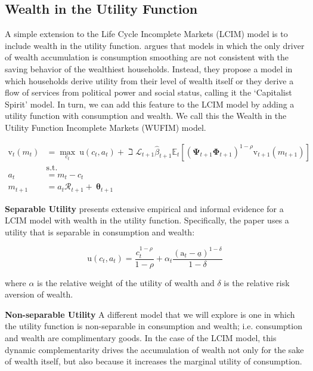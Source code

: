 \documentclass{article}
\newcommand{\DiscFac}{\beta}
\newcommand{\uFunc}{\mathrm{u}}
\newcommand{\vFunc}{\mathrm{v}}
\newcommand{\Alive}{\mathcal{L}}
\newcommand{\Ex}{\mathbb{E}}
\newcommand{\CRRA}{\rho}
\newcommand{\PermGroFac}{\pmb{\Phi}}
\newcommand{\PermShk}{\mathbf{\Psi}}
\newcommand{\aNrm}{a}
\newcommand{\cNrm}{c}
\newcommand{\RNrm}{\mathcal{R}}
\newcommand{\TranShkEmp}{\pmb{\theta}}
\newcommand{\aFunc}{\mathrm{a}}
\newcommand{\kapShare}{\alpha}
\newcommand{\wealthShare}{\delta}
\begin{document}
\subsection{Wealth in the Utility Function}\label{Wealth in the Utility Function}

A simple extension to the Life Cycle Incomplete Markets (LCIM) model is to include wealth in the utility function. \cite{Carroll_1998} argues that models in which the only driver of wealth accumulation is consumption smoothing are not consistent with the saving behavior of the wealthiest households. Instead, they propose a model in which households derive utility from their level of wealth itself or they derive a flow of services from political power and social status, calling it the `Capitalist Spirit' model. In turn, we can add this feature to the LCIM model by adding a utility function with consumption and wealth. We call this the Wealth in the Utility Function Incomplete Markets (WUFIM) model.

\begin{equation}
\begin{align}
    {\vFunc}_{t}({m}_{t}) & = \max_{\cNrm_{t}} ~ \uFunc(\cNrm_{t}, \aNrm_{t})+\beth\Alive_{t+1}\hat{\DiscFac}_{t+1}
    \Ex_{t}[(\PermShk_{t+1}\PermGroFac_{t+1})^{1-\CRRA}{\vFunc}_{t+1}({m}_{t+1})]
    \\ & \text{s.t.} & 
    \\ \aNrm_{t} & = {m}_{t}-\cNrm_{t} 
    \\ {m}_{t+1} & = \aNrm_{t}\RNrm_{t+1}+ ~\TranShkEmp_{t+1}
\end{align}
\end{equation}

\textbf{Separable Utility} \cite{Carroll_1998} presents extensive empirical and informal evidence for a LCIM model with wealth in the utility function. Specifically, the paper uses a utility that is separable in consumption and wealth:

\begin{equation}
\uFunc(\cNrm_{t}, \aNrm_{t}) = \frac{\cNrm_{t}^{1-\CRRA}}{1-\CRRA}
    + \kapShare_{t} \frac{(\aFunc_{t} - \underline\aNrm)^{1-\wealthShare}}{1-\wealthShare}
\end{equation}

where $\kapShare$ is the relative weight of the utility of wealth and $\wealthShare$ is the relative risk aversion of wealth.

\textbf{Non-separable Utility} A different model that we will explore is one in which the utility function is non-separable in consumption and wealth; i.e. consumption and wealth are complimentary goods. In the case of the LCIM model, this dynamic complementarity drives the accumulation of wealth not only for the sake of wealth itself, but also because it increases the marginal utility of consumption.
\end{document}
